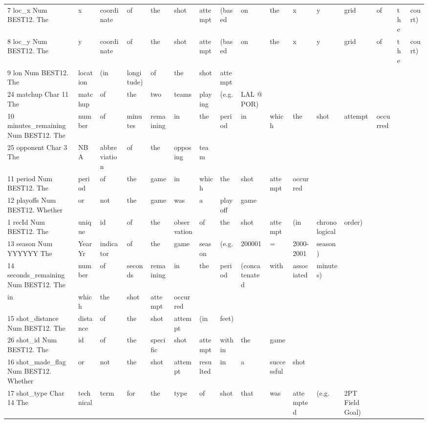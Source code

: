 {\begin{table}[h]
\begin{tabular}{llllllllllllllll}
    7	loc\_x	Num	BEST12.	The & x & coordinate & of & the & shot & attempt & (based & on & the & x & y & grid & of & the & court) \\
    8	loc\_y	Num	BEST12.	The & y & coordinate & of & the & shot & attempt & (based & on & the & x & y & grid & of & the & court) \\
    9	lon	Num	BEST12.	The & location & (in & longitude) & of & the & shot & attempt &  &  &  &  &  &  &  &  \\
    24	matchup	Char	11	The & matchup & of & the & two & teams & playing & (e.g. & LAL @ POR) &  &  &  &  &  &  &  \\
    10	minutes\_remaining	Num	BEST12.	The & number & of & minutes & remaining & in & the & period & in & which & the & shot & attempt & occurred &  &  \\
    25	opponent	Char	3	The & NBA & abbreviation & of & the & opposing & team &  &  &  &  &  &  &  &  &  \\
    11	period	Num	BEST12.	The & period & of & the & game & in & which & the & shot & attempt & occurred &  &  &  &  &  \\
    12	playoffs	Num	BEST12.	Whether & or & not & the & game & was & a & playoff & game &  &  &  &  &  &  &  \\
    1	recId	Num	BEST12.	The & unique & id & of & the & observation & of & the & shot & attempt & (in & chronological & order) &  &  &  \\
    13	season	Num	YYYYYY	The & YearYr & indicator & of & the & game & season & (e.g. & 200001 & = & 2000-2001 & season) &  &  &  &  \\
    14	seconds\_remaining	Num	BEST12.	The & number & of & seconds & remaining & in & the & period & (concatenated & with & associated & minutes) &  &  &  &  \\
    in & which & the & shot & attempt & occurred &  &  &  &  &  &  &  &  &  &  \\
    15	shot\_distance	Num	BEST12.	The & distance & of & the & shot & attempt & (in & feet) &  &  &  &  &  &  &  &  \\
    26	shot\_id	Num	BEST12.	The & id & of & the & specific & shot & attempt & within & the & game &  &  &  &  &  &  \\
    16	shot\_made\_flag	Num	BEST12.	Whether & or & not & the & shot & attempt & resulted & in & a & successful & shot &  &  &  &  &  \\
    17	shot\_type	Char	14	The & technical & term & for & the & type & of & shot & that & was & attempted & (e.g. & 2PT Field Goal) &  &  &  \\

\end{tabular}
\end{table}}
